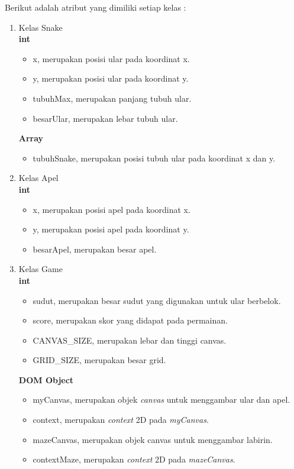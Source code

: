 Berikut adalah atribut yang dimiliki setiap kelas :

\begin{enumerate}
	\item Kelas Snake\\
\textbf{int}

\begin{itemize}
	\item x, merupakan posisi ular pada koordinat x.
	\item y, merupakan posisi ular pada koordinat y.
	\item tubuhMax, merupakan panjang tubuh ular.
	\item besarUlar, merupakan lebar tubuh ular.
\end{itemize}

\textbf{Array}

\begin{itemize}
	\item tubuhSnake, merupakan posisi tubuh ular pada koordinat x dan y.
\end{itemize}

	\item Kelas Apel\\
	\textbf{int}
	
\begin{itemize}
	\item x, merupakan posisi apel pada koordinat x.
	\item y, merupakan posisi apel pada koordinat y.
	\item besarApel, merupakan besar apel.
\end{itemize}

\item Kelas Game \\
\textbf{int}

\begin{itemize}
	\item sudut, merupakan besar sudut yang digunakan untuk ular berbelok.
	\item score, merupakan skor yang didapat pada permainan.
	\item CANVAS\_SIZE, merupakan lebar dan tinggi canvas.
	\item GRID\_SIZE, merupakan besar grid.
\end{itemize}

\textbf{DOM Object}

\begin{itemize}
	\item myCanvas, merupakan objek \textit{canvas} untuk menggambar ular dan apel.
	\item context, merupakan \textit{context} 2D pada \textit{myCanvas}. 
	\item mazeCanvas, merupakan objek canvas untuk menggambar labirin.
	\item contextMaze, merupakan \textit{context} 2D  pada \textit{mazeCanvas}.
\end{itemize}


\end{enumerate}
